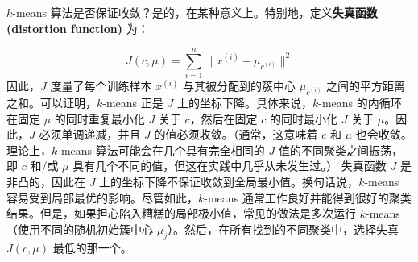 $k$-means 算法是否保证收敛？是的，在某种意义上。特别地，定义\textbf{失真函数 (distortion function)} 为：

\[
    J(c, \mu) = \sum_{i=1}^n \|x^{(i)} - \mu_{c^{(i)}} \|^2
\]
因此，$J$ 度量了每个训练样本 $x^{(i)}$ 与其被分配到的簇中心 $\mu_{c^{(i)}}$ 之间的平方距离之和。可以证明，$k$-means 正是 $J$ 上的坐标下降。具体来说，$k$-means 的内循环在固定 $\mu$ 的同时重复最小化 $J$ 关于 $c$，然后在固定 $c$ 的同时最小化 $J$ 关于 $\mu$。因此，$J$ 必须单调递减，并且 $J$ 的值必须收敛。（通常，这意味着 $c$ 和 $\mu$ 也会收敛。理论上，$k$-means 算法可能会在几个具有完全相同的 $J$ 值的不同聚类之间振荡，即 $c$ 和/或 $\mu$ 具有几个不同的值，但这在实践中几乎从未发生过。）
失真函数 $J$ 是非凸的，因此在 $J$ 上的坐标下降不保证收敛到全局最小值。换句话说，$k$-means 容易受到局部最优的影响。尽管如此，$k$-means 通常工作良好并能得到很好的聚类结果。但是，如果担心陷入糟糕的局部极小值，常见的做法是多次运行 $k$-means（使用不同的随机初始簇中心 $\mu_j$）。然后，在所有找到的不同聚类中，选择失真 $J(c, \mu)$ 最低的那一个。
